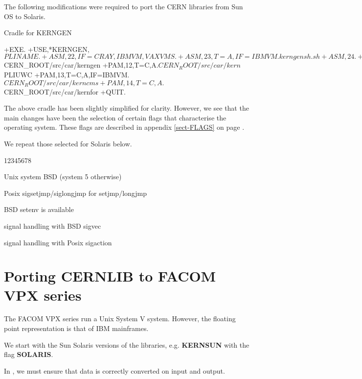 The following modifications were required to port the
CERN libraries from Sun OS to Solaris.

\begin{XMPt}{Cradle for KERNGEN}

+EXE.
+USE,*KERNGEN,$PLINAME.
+ASM,22    ,IF=CRAY,IBMVM,VAXVMS.
+ASM,23,T=A,IF=IBMVM.kerngensh.sh
+ASM,24.
+ASM,31,T=A.:kerngen2F.f
+USE,QSYSBSD ,T=I,IF=SOLARIS.
+USE,QENVBSD ,T=I,IF=SOLARIS.
+USE,QSIGJMP   ,IF=SOLARIS.
+USE,QGETCWD   ,IF=SOLARIS.
+USE,QSIGPOSIX ,IF=SOLARIS.
+DIV,P=TCGEN,D=UCOPY2,IF=SOLARIS.
+DEL,P=SUNGS,D=JUMPAD,C=1-9,IF=SOLARIS.
+DEL,P=SUNGS,D=JUMPX2,C=1-46,IF=SOLARIS.
+PAM,11,T=C,A.$CERN_ROOT/src/car/kerngen
+PAM,12,T=C,A.$CERN_ROOT/src/car/kern$PLIUWC
+PAM,13,T=C,A,IF=IBMVM.$CERN_ROOT/src/car/kerncms
+PAM,14,T=C,A.$CERN_ROOT/src/car/kernfor
+QUIT.

\end{XMPt}

The above cradle has been slightly simplified for clarity.
However, we see that the main changes have been the selection
of certain flags that characterise the operating system.
These flags are described in appendix \ref{sect-FLAGS}
on page \pageref{sect-FLAGS}.

We repeat those selected for Solaris below.

\begin{DLtt}{12345678}

\item[QSYSBSD]   Unix system BSD (system 5 otherwise)
\item[QSIGJMP]   Posix sigsetjmp/siglongjmp for setjmp/longjmp
\item[QENVBSD]   BSD setenv is available
\item[QSIGBSD]   signal handling with BSD   sigvec
\item[QSIGPOSIX] signal handling with Posix sigaction

\end{DLtt}

\section{Porting CERNLIB to FACOM VPX series}

The FACOM VPX series run a Unix System V system.
However, the floating point representation
is that of IBM mainframes.

We start with the Sun Solaris versions of the libraries,
e.g. {\bf KERNSUN} with the flag {\bf SOLARIS}.

In \ZEBRA{}, we must ensure that data is correctly converted
on input and output. 

